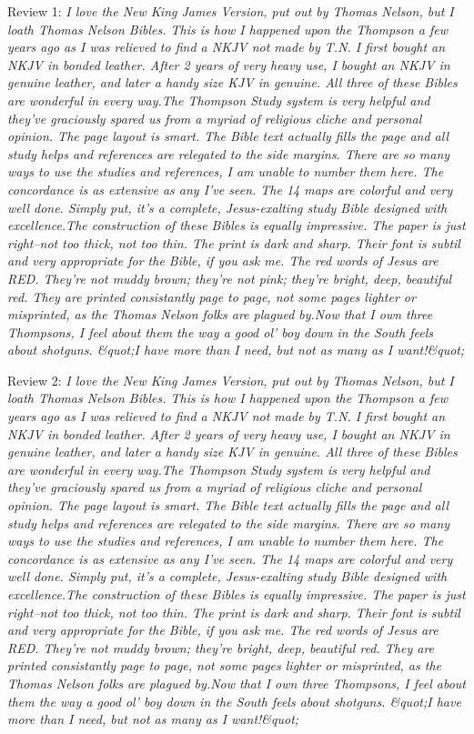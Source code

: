 \documentclass[12pt, a4paper]{article}
\begin{document}
\begin{itemize}
    {\fontsize{9pt}{11pt}\selectfont
    \item Review 1: \textit{I love the New King James Version, put out by Thomas Nelson, but I loath Thomas Nelson Bibles. This is how I happened upon the Thompson a few years ago as I was relieved to find a NKJV not made by T.N. I first bought an NKJV in bonded leather. After 2 years of very heavy use, I bought an NKJV in genuine leather, and later a handy size KJV in genuine. All three of these Bibles are wonderful in every way.The Thompson Study system is very helpful and they've graciously spared us from a myriad of religious cliche and personal opinion. The page layout is smart. The Bible text actually fills the page and all study helps and references are relegated to the side margins. There are so many ways to use the studies and references, I am unable to number them here. The concordance is as extensive as any I've seen. The 14 maps are colorful and very well done. Simply put, it's a complete, Jesus-exalting study Bible designed with excellence.The construction of these Bibles is equally impressive. The paper is just right--not too thick, not too thin. The print is dark and sharp. Their font is subtil and very appropriate for the Bible, if you ask me. The red words of Jesus are RED. They're not muddy brown; they're not pink; they're bright, deep, beautiful red. They are printed consistantly page to page, not some pages lighter or misprinted, as the Thomas Nelson folks are plagued by.Now that I own three Thompsons, I feel about them the way a good ol' boy down in the South feels about shotguns. \&quot;I have more than I need, but not as many as I want!\&quot;}
    \item Review 2: \textit{I love the New King James Version, put out by Thomas Nelson, but I loath Thomas Nelson Bibles. This is how I happened upon the Thompson a few years ago as I was relieved to find a NKJV not made by T.N. I first bought an NKJV in bonded leather. After 2 years of very heavy use, I bought an NKJV in genuine leather, and later a handy size KJV in genuine. All three of these Bibles are wonderful in every way.The Thompson Study system is very helpful and they've graciously spared us from a myriad of religious cliche and personal opinion. The page layout is smart. The Bible text actually fills the page and all study helps and references are relegated to the side margins. There are so many ways to use the studies and references, I am unable to number them here. The concordance is as extensive as any I've seen. The 14 maps are colorful and very well done. Simply put, it's a complete, Jesus-exalting study Bible designed with excellence.The construction of these Bibles is equally impressive. The paper is just right--not too thick, not too thin. The print is dark and sharp. Their font is subtil and very appropriate for the Bible, if you ask me. The red words of Jesus are RED. They're not muddy brown; they're bright, deep, beautiful red. They are printed consistantly page to page, not some pages lighter or misprinted, as the Thomas Nelson folks are plagued by.Now that I own three Thompsons, I feel about them the way a good ol' boy down in the South feels about shotguns. \&quot;I have more than I need, but not as many as I want!\&quot;}
}
\end{itemize}
\end{document}
